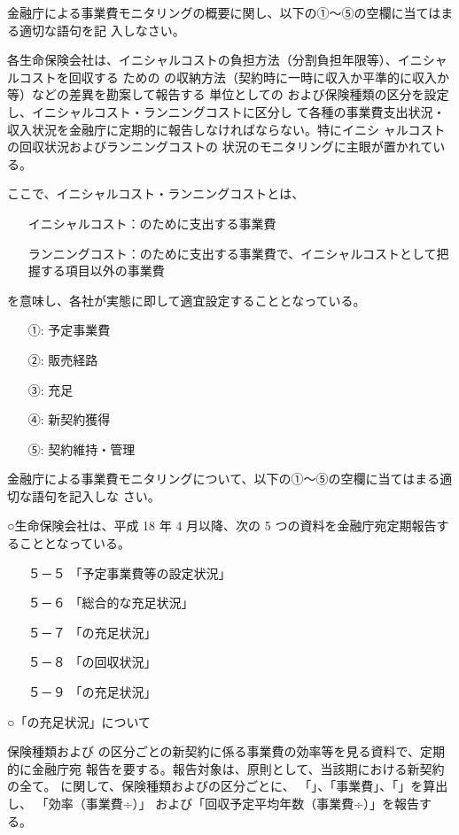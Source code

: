 \documentclass[report,gutter=10mm,fore-edge=10mm,uplatex,dvipdfmx]{jlreq}
\begin{document}
金融庁による事業費モニタリングの概要に関し、以下の①～⑤の空欄に当てはまる適切な語句を記
入しなさい。

各生命保険会社は、イニシャルコストの負担方法（分割負担年限等）、イニシャルコストを回収する
ための
の収納方法（契約時に一時に収入か平準的に収入か等）などの差異を勘案して報告する
単位としての
および保険種類の区分を設定し、イニシャルコスト・ランニングコストに区分し
て各種の事業費支出状況・
収入状況を金融庁に定期的に報告しなければならない。特にイニシ
ャルコストの回収状況およびランニングコストの
状況のモニタリングに主眼が置かれている。

ここで、イニシャルコスト・ランニングコストとは、
\begin{itemize}
\item[]  イニシャルコスト：のために支出する事業費
\item[]  ランニングコスト：のために支出する事業費で、イニシャルコストとして把握する項目以外の事業費
\end{itemize}
を意味し、各社が実態に即して適宜設定することとなっている。
\answer{}
\begin{itemize}
\item[①: ] 予定事業費
\item[②: ] 販売経路
\item[③: ] 充足
\item[④: ] 新契約獲得
\item[⑤: ] 契約維持・管理
\end{itemize}

金融庁による事業費モニタリングについて、以下の①～⑤の空欄に当てはまる適切な語句を記入しな
さい。

○生命保険会社は、平成 18 年 4 月以降、次の 5 つの資料を金融庁宛定期報告することとなっている。
\begin{itemize}
\item[] ５－５ 「予定事業費等の設定状況」
\item[] ５－６ 「総合的な充足状況」
\item[] ５－７ 「の充足状況」
\item[] ５－８ 「の回収状況」
\item[] ５－９ 「の充足状況」
\end{itemize}

○「の充足状況」について

保険種類および
の区分ごとの新契約に係る事業費の効率等を見る資料で、定期的に金融庁宛
報告を要する。報告対象は、原則として、当該期における新契約の全て。
に関して、保険種類およびの区分ごとに、
「」、「事業費」、「」を算出し、
「効率（事業費÷）」
および「回収予定平均年数（事業費÷）」を報告する。
\end{document}
